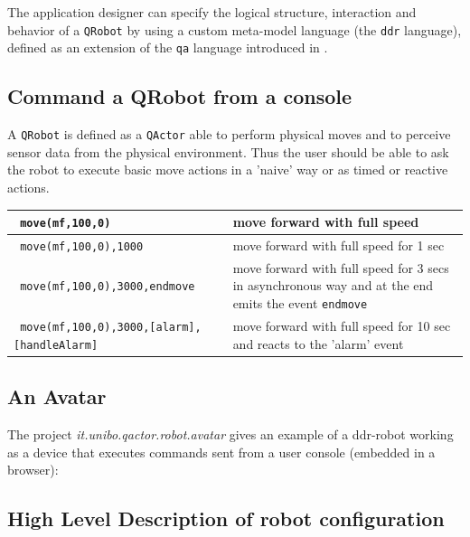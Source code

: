 \medskip 
The application designer can specify the logical structure, interaction and behavior of a \texttt{QRobot} by using a custom meta-model language (the \texttt{ddr} language), defined as an extension of the \texttt{qa} language introduced in .

\subsection{Command a QRobot from a console }

A \texttt{QRobot} is defined as a \texttt{QActor} able to perform physical moves and to perceive sensor data from the physical environment. Thus the user should be able to ask the robot to execute basic move actions in a 'naive' way or as timed or reactive actions.

\medskip 
\noindent
\begin{footnotesize}
\begin{tabular}{|p{}|p{}|}
\hline 
\texttt{ move(mf,100,0) } & move forward with full speed   \\ 
\hline 
\texttt{ move(mf,100,0),1000 } & move forward with full speed for 1 sec  \\ 
\hline 
\texttt{ move(mf,100,0),3000,endmove } & move forward with full speed for 3 secs in asynchronous way and at the end emits the event \texttt{endmove} \\
\hline 
\texttt{ move(mf,100,0),3000,[alarm],[handleAlarm] } & move forward with full speed for 10 sec and reacts to the 'alarm' event \\ 
\hline 
\end{tabular} 
\end{footnotesize}

\subsection{An Avatar}

The project \textit{it.unibo.qactor.robot.avatar}  gives an example of a ddr-robot working as a device that executes commands sent from a user console (embedded in a browser):



\subsection{High Level Description of robot configuration }


